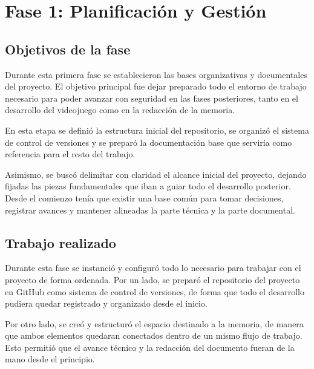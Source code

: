 \chapter{Fase 1: Planificación y Gestión}

\begin{abstract}
Este capítulo recoge el trabajo realizado durante la Fase 1 del proyecto, centrada en la
planificación inicial, la organización del trabajo y la preparación del marco de gestión
que ha permitido desarrollar el resto de la memoria con continuidad.
\end{abstract}

\section{Objetivos de la fase}
Durante esta primera fase se establecieron las bases organizativas y documentales del proyecto.
El objetivo principal fue dejar preparado todo el entorno de trabajo necesario para poder avanzar
con seguridad en las fases posteriores, tanto en el desarrollo del videojuego como en la redacción
de la memoria.

En esta etapa se definió la estructura inicial del repositorio, se organizó el sistema de control de
versiones y se preparó la documentación base que serviría como referencia para el resto del trabajo.

Asimismo, se buscó delimitar con claridad el alcance inicial del proyecto, dejando fijadas las piezas
fundamentales que iban a guiar todo el desarrollo posterior. Desde el comienzo tenía que existir una
base común para tomar decisiones, registrar avances y mantener alineadas la parte técnica y la parte
documental.

\section{Trabajo realizado}
Durante esta fase se instanció y configuró todo lo necesario para trabajar con el proyecto de forma
ordenada. Por un lado, se preparó el repositorio del proyecto en GitHub como sistema de control de
versiones, de forma que todo el desarrollo pudiera quedar registrado y organizado desde el inicio.

Por otro lado, se creó y estructuró el espacio destinado a la memoria, de manera que ambos elementos
quedaran conectados dentro de un mismo flujo de trabajo. Esto permitió que el avance técnico y la
redacción del documento fueran de la mano desde el principio.


